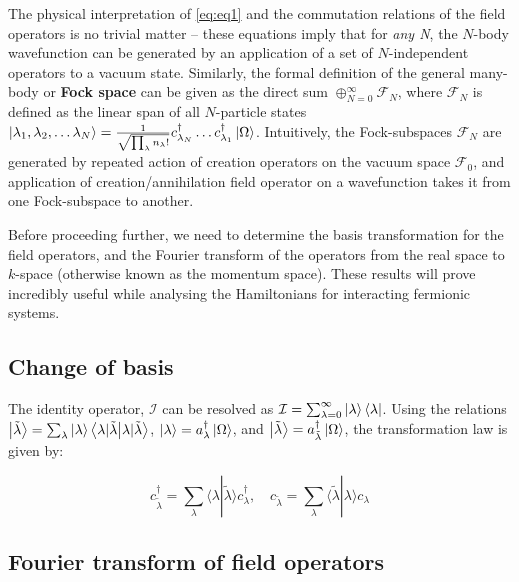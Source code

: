 The physical interpretation of \ref{eq:eq1} and the commutation relations of the field operators is no trivial matter -- these equations imply that for \textit{any N}, the $N$-body wavefunction can be generated by an application of a set of $N$-independent operators to a vacuum state. Similarly, the formal definition of the general many-body or \textbf{Fock space} can be given as the direct sum $\oplus_{N=0}^{\infty}\mathcal{F}_N$, where $\mathcal{F}_N$ is defined as the linear span of all $N$-particle states $\ket{\lambda_{1}, \lambda_{2},\ldots \lambda_{N}} = \frac{1}{\sqrt{\prod_{\lambda}n_{\lambda}!}} c_{\lambda_N}^{\dagger} \ldots c_{\lambda_1}^{\dagger} \ket{\Omega}$. Intuitively, the Fock-subspaces $\mathcal{F}_N$ are generated by repeated action of creation operators on the vacuum space $\mathcal{F}_0$, and application of creation/annihilation field operator on a wavefunction takes it from one Fock-subspace to another. \par 

Before proceeding further, we need to determine the basis transformation for the field operators, and the Fourier transform of the operators from the real space to $k$-space (otherwise known as the momentum space). These results will prove incredibly useful while analysing the Hamiltonians for interacting fermionic systems. \par

\clearpage

\subsection{Change of basis}

The identity operator, $\mathcal{I}$ can be resolved as $\mathcal{I} = \sum_{\lambda=0}^{\infty}\ket{\lambda}\bra{\lambda}$. Using the relations $\ket{\tilde{\lambda}} = \sum_{\lambda}\ket{\lambda}\braket{\lambda|\tilde{\lambda}}$, $\ket{\lambda} = a_{\lambda}^{\dagger}\ket{\Omega}$, and $\ket{\tilde{\lambda}} = a_{\tilde{\lambda}}^{\dagger} \ket{\Omega}$, the transformation law is given by:

\begin{equation}
    c_{\tilde{\lambda}}^{\dagger} = \sum_{\lambda} \langle \lambda|\tilde{\lambda} \rangle c_{\lambda}^{\dagger}, \quad c_{\tilde{\lambda}} = \sum_{\lambda} \langle \tilde{\lambda}|\lambda \rangle c_{\lambda}
\end{equation}

\subsection{Fourier transform of field operators}

